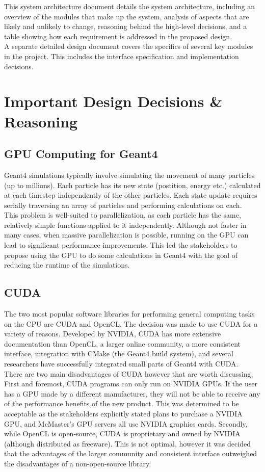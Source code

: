 \documentclass[12pt]{article}
\begin{document}
This system architecture document details the system architecture, including an overview of the modules that make up the system, analysis of aspects that are likely and unlikely to change, reasoning behind the high-level decisions, and a table showing how each requirement is addressed in the proposed design.\\

A separate detailed design document covers the specifics of several key modules in the project. This includes the interface specification and implementation decisions.

\section{Important Design Decisions \& Reasoning}
\subsection{GPU Computing for Geant4}\label{Sec_WhyGPU}
Geant4 simulations typically involve simulating the movement of many particles (up to millions). Each particle has its new state (postition, energy etc.) calculated at each timestep independently of the other particles. Each state update requires serially traversing an array of particles and performing calculations on each.\\

This problem is well-suited to parallelization, as each particle has the same, relatively simple functions applied to it independently. Although not faster in many cases, when massive parallelization is possible, running on the GPU can lead to significant performance improvements. This led the stakeholders to propose using the GPU to do some calculations in Geant4 with the goal of reducing the runtime of the simulations.

\subsection{CUDA}
The two most popular software libraries for performing general computing tasks on the CPU are CUDA and OpenCL. The decision was made to use CUDA for a variety of reasons. Developed by NVIDIA, CUDA has more extensive documentation than OpenCL, a larger online community, a more consistent interface, integration with CMake (the Geant4 build system), and several researchers have successfully integrated small parts of Geant4 with CUDA.\\

There are two main disadvantages of CUDA however that are worth discussing. First and foremost, CUDA programs can only run on NVIDIA GPUs. If the user has a GPU made by a different manufacturer, they will not be able to receive any of the performance benefits of the new product. This was determined to be acceptable as the stakeholders explicitly stated plans to purchase a NVIDIA GPU, and McMaster's GPU servers all use NVIDIA graphics cards. Secondly, while OpenCL is open-source, CUDA is proprietary and owned by NVIDIA (although distributed as freeware). This is not optimal, however it was decided that the advantages of the larger community and consistent interface outweighed the disadvantages of a non-open-source library.
\end{document}
